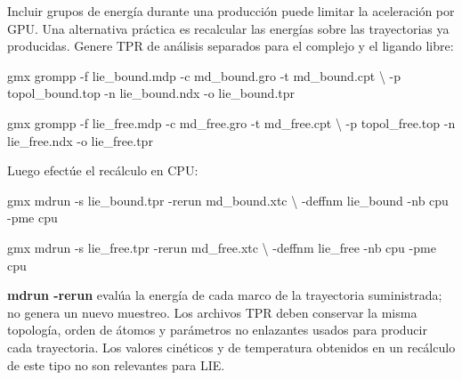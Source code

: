 \documentclass[
  spanish,
  11pt,
  a4paper]{article}
\newenvironment{Shaded}{\begin{snugshade}}{\end{snugshade}}
\newcommand{\AttributeTok}[1]{\textcolor[rgb]{0.13,0.29,0.53}{#1}}
\newcommand{\DataTypeTok}[1]{\textcolor[rgb]{0.13,0.29,0.53}{#1}}
\newcommand{\ExtensionTok}[1]{#1}
\newcommand{\NormalTok}[1]{#1}
\begin{document}
Incluir grupos de energía durante una producción puede limitar la
aceleración por GPU. Una alternativa práctica es recalcular las energías
sobre las trayectorias ya producidas. Genere TPR de análisis separados
para el complejo y el ligando libre:

\begin{Shaded}
\begin{Highlighting}[]
\ExtensionTok{gmx}\NormalTok{ grompp }\AttributeTok{{-}f}\NormalTok{ lie\_bound.mdp }\AttributeTok{{-}c}\NormalTok{ md\_bound.gro }\AttributeTok{{-}t}\NormalTok{ md\_bound.cpt }\DataTypeTok{\textbackslash{}}
  \AttributeTok{{-}p}\NormalTok{ topol\_bound.top }\AttributeTok{{-}n}\NormalTok{ lie\_bound.ndx }\AttributeTok{{-}o}\NormalTok{ lie\_bound.tpr}

\ExtensionTok{gmx}\NormalTok{ grompp }\AttributeTok{{-}f}\NormalTok{ lie\_free.mdp }\AttributeTok{{-}c}\NormalTok{ md\_free.gro }\AttributeTok{{-}t}\NormalTok{ md\_free.cpt }\DataTypeTok{\textbackslash{}}
  \AttributeTok{{-}p}\NormalTok{ topol\_free.top }\AttributeTok{{-}n}\NormalTok{ lie\_free.ndx }\AttributeTok{{-}o}\NormalTok{ lie\_free.tpr}
\end{Highlighting}
\end{Shaded}

Luego efectúe el recálculo en CPU:

\begin{Shaded}
\begin{Highlighting}[]
\ExtensionTok{gmx}\NormalTok{ mdrun }\AttributeTok{{-}s}\NormalTok{ lie\_bound.tpr }\AttributeTok{{-}rerun}\NormalTok{ md\_bound.xtc }\DataTypeTok{\textbackslash{}}
  \AttributeTok{{-}deffnm}\NormalTok{ lie\_bound }\AttributeTok{{-}nb}\NormalTok{ cpu }\AttributeTok{{-}pme}\NormalTok{ cpu}

\ExtensionTok{gmx}\NormalTok{ mdrun }\AttributeTok{{-}s}\NormalTok{ lie\_free.tpr }\AttributeTok{{-}rerun}\NormalTok{ md\_free.xtc }\DataTypeTok{\textbackslash{}}
  \AttributeTok{{-}deffnm}\NormalTok{ lie\_free }\AttributeTok{{-}nb}\NormalTok{ cpu }\AttributeTok{{-}pme}\NormalTok{ cpu}
\end{Highlighting}
\end{Shaded}

\textbf{mdrun -rerun} evalúa la energía de cada marco de la trayectoria
suministrada; no genera un nuevo muestreo. Los archivos TPR deben
conservar la misma topología, orden de átomos y parámetros no enlazantes
usados para producir cada trayectoria. Los valores cinéticos y de
temperatura obtenidos en un recálculo de este tipo no son relevantes
para LIE.
\end{document}
